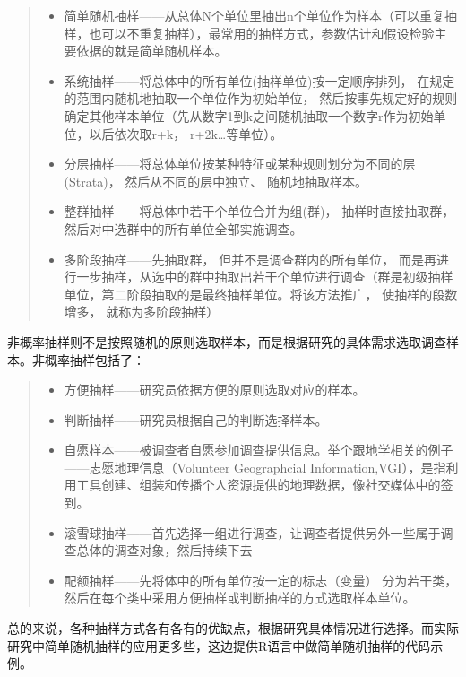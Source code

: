 \documentclass[]{ctexbook}
\providecommand{\tightlist}{%
  \setlength{\itemsep}{0pt}\setlength{\parskip}{0pt}}
\begin{document}
\begin{quote}
\begin{itemize}
\tightlist
\item
  简单随机抽样------从总体N个单位里抽出n个单位作为样本（可以重复抽样，也可以不重复抽样），最常用的抽样方式，参数估计和假设检验主要依据的就是简单随机样本。
\item
  系统抽样------将总体中的所有单位(抽样单位)按一定顺序排列， 在规定的范围内随机地抽取一个单位作为初始单位， 然后按事先规定好的规则确定其他样本单位（先从数字1到k之间随机抽取一个数字r作为初始单位，以后依次取r+k， r+2k\ldots 等单位）。
\item
  分层抽样------将总体单位按某种特征或某种规则划分为不同的层(Strata)， 然后从不同的层中独立、 随机地抽取样本。
\item
  整群抽样------将总体中若干个单位合并为组(群)， 抽样时直接抽取群， 然后对中选群中的所有单位全部实施调查。
\item
  多阶段抽样------先抽取群， 但并不是调查群内的所有单位， 而是再进行一步抽样，从选中的群中抽取出若干个单位进行调查（群是初级抽样单位，第二阶段抽取的是最终抽样单位。将该方法推广， 使抽样的段数增多， 就称为多阶段抽样）
\end{itemize}
\end{quote}

非概率抽样则不是按照随机的原则选取样本，而是根据研究的具体需求选取调查样本。非概率抽样包括了：

\begin{quote}
\begin{itemize}
\tightlist
\item
  方便抽样------研究员依据方便的原则选取对应的样本。
\item
  判断抽样------研究员根据自己的判断选择样本。
\item
  自愿样本------被调查者自愿参加调查提供信息。举个跟地学相关的例子------志愿地理信息（Volunteer Geographcial Information,VGI），是指利用工具创建、组装和传播个人资源提供的地理数据，像社交媒体中的签到。
\item
  滚雪球抽样------首先选择一组进行调查，让调查者提供另外一些属于调查总体的调查对象，然后持续下去
\item
  配额抽样------先将体中的所有单位按一定的标志（变量） 分为若干类， 然后在每个类中采用方便抽样或判断抽样的方式选取样本单位。
\end{itemize}
\end{quote}

总的来说，各种抽样方式各有各有的优缺点，根据研究具体情况进行选择。而实际研究中简单随机抽样的应用更多些，这边提供R语言中做简单随机抽样的代码示例。
\end{document}
